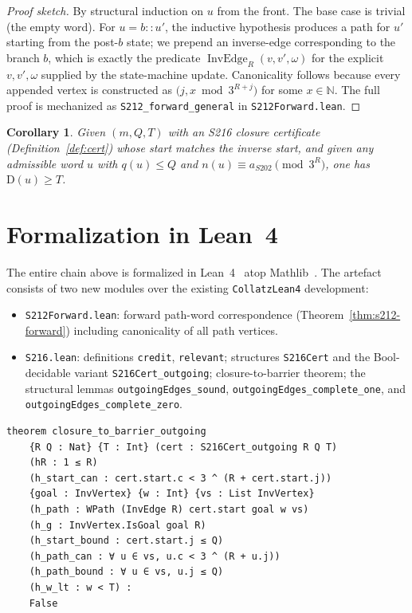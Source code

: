 \documentclass[11pt,a4paper]{article}
\theoremstyle{plain}
\newtheorem{corollary}[theorem]{Corollary}
\theoremstyle{definition}
\theoremstyle{plain}
\newcommand{\NN}{\mathbb{N}}
\newcommand{\aS}{a_{S202}}
\newcommand{\defect}{\mathrm{D}}
\DeclareMathOperator{\InvEdge}{InvEdge}
\begin{document}
\begin{proof}[Proof sketch]
By structural induction on $u$ from the front. The base case is
trivial (the empty word). For $u = b :: u'$, the inductive hypothesis
produces a path for $u'$ starting from the post-$b$ state; we
prepend an inverse-edge corresponding to the branch $b$, which is
exactly the predicate
$\InvEdge_{R}(v, v', \omega)$ for the explicit
$v, v', \omega$ supplied by the state-machine update.
Canonicality follows because every appended vertex is constructed as
$\bigl(j, x \bmod 3^{R+j}\bigr)$ for some $x \in \NN$.
The full proof is mechanized as \texttt{S212\_forward\_general} in
\texttt{S212Forward.lean}.
\end{proof}

\begin{corollary}\label{cor:full-chain}
Given $(m, Q, T)$ with an S216 closure certificate (Definition~\ref{def:cert})
whose start matches the inverse start, and given any admissible word $u$ with
$q(u) \le Q$ and $n(u) \equiv \aS \pmod{3^R}$, one has
$\defect(u) \ge T$.
\end{corollary}

\section{Formalization in Lean~4}\label{sec:lean}

The entire chain above is formalized in Lean~4~\cite{lean4} atop
Mathlib~\cite{mathlib}. The artefact consists of two new modules over
the existing \texttt{CollatzLean4} development:

\begin{itemize}
\item \texttt{S212Forward.lean}: forward path-word correspondence
      (Theorem~\ref{thm:s212-forward}) including canonicality of all
      path vertices.
\item \texttt{S216.lean}: definitions \texttt{credit}, \texttt{relevant};
      structures \texttt{S216Cert} and the Bool-decidable variant
      \texttt{S216Cert\_outgoing}; closure-to-barrier theorem; the
      structural lemmas \texttt{outgoingEdges\_sound},
      \texttt{outgoingEdges\_complete\_one}, and
      \texttt{outgoingEdges\_complete\_zero}.
\end{itemize}

\begin{lstlisting}
theorem closure_to_barrier_outgoing
    {R Q : Nat} {T : Int} (cert : S216Cert_outgoing R Q T)
    (hR : 1 ≤ R)
    (h_start_can : cert.start.c < 3 ^ (R + cert.start.j))
    {goal : InvVertex} {w : Int} {vs : List InvVertex}
    (h_path : WPath (InvEdge R) cert.start goal w vs)
    (h_g : InvVertex.IsGoal goal R)
    (h_start_bound : cert.start.j ≤ Q)
    (h_path_can : ∀ u ∈ vs, u.c < 3 ^ (R + u.j))
    (h_path_bound : ∀ u ∈ vs, u.j ≤ Q)
    (h_w_lt : w < T) :
    False
\end{lstlisting}
\end{document}
